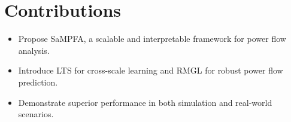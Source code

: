 \documentclass{article}
\begin{document}
\section{Contributions}
\begin{itemize}
    \item Propose SaMPFA, a scalable and interpretable framework for power flow analysis.
    \item Introduce LTS for cross-scale learning and RMGL for robust power flow prediction.
    \item Demonstrate superior performance in both simulation and real-world scenarios.
\end{itemize}
\end{document}
